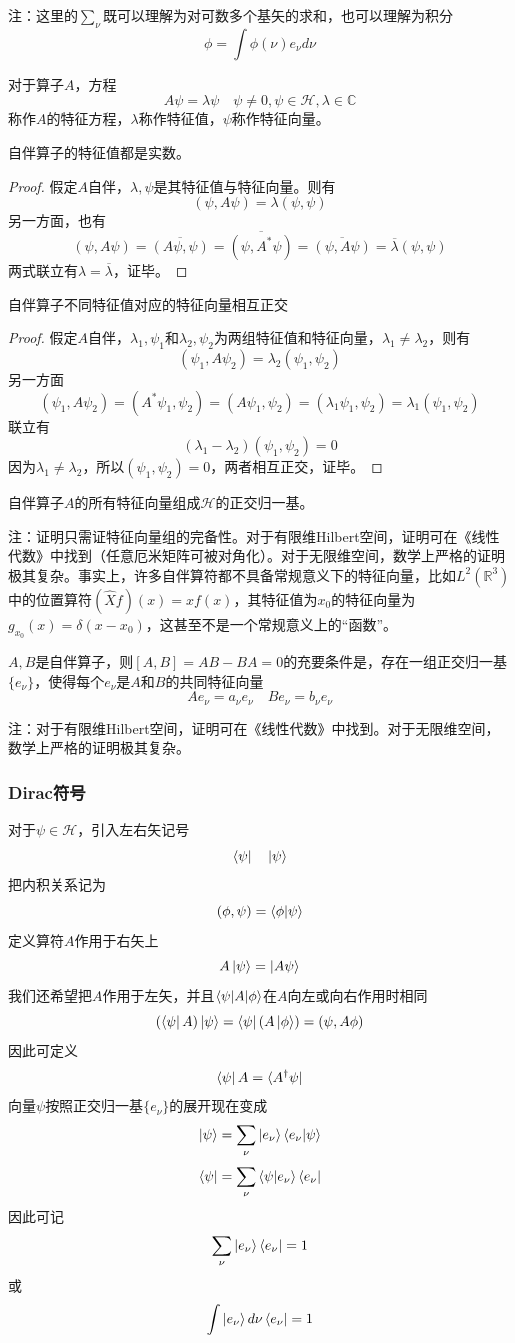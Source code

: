 注：这里的$\sum_\nu$既可以理解为对可数多个基矢的求和，也可以理解为积分
$$\phi=\int \phi(\nu)e_\nu d\nu$$

对于算子$A$，方程
$$A\psi=\lambda\psi\quad \psi\neq 0,\psi\in\mathcal{H},\lambda\in\mathbb{C}$$
称作$A$的特征方程，$\lambda$称作特征值，$\psi$称作特征向量。
\begin{theorem}
    自伴算子的特征值都是实数。
\end{theorem}
\begin{proof}
    假定$A$自伴，$\lambda,\psi$是其特征值与特征向量。则有
    $$(\psi,A\psi)=\lambda(\psi,\psi)$$
    另一方面，也有
    $$(\psi,A\psi)=\overline{(A\psi,\psi)}=\overline{(\psi,A^*\psi)}=\overline{(\psi,A\psi)}=\overline{\lambda}(\psi,\psi)$$
    两式联立有$\lambda=\overline{\lambda}$，证毕。
\end{proof}
\begin{theorem}
    自伴算子不同特征值对应的特征向量相互正交
\end{theorem}
\begin{proof}
    假定$A$自伴，$\lambda_1,\psi_1$和$\lambda_2,\psi_2$为两组特征值和特征向量，$\lambda_1\neq\lambda_2$，则有
    $$(\psi_1,A\psi_2)=\lambda_2(\psi_1,\psi_2)$$
    另一方面
    $$(\psi_1,A\psi_2)=(A^*\psi_1,\psi_2)=(A\psi_1,\psi_2)=(\lambda_1\psi_1,\psi_2)=\lambda_1(\psi_1,\psi_2)$$
    联立有
    $$(\lambda_1-\lambda_2)(\psi_1,\psi_2)=0$$
    因为$\lambda_1\neq\lambda_2$，所以$(\psi_1,\psi_2)=0$，两者相互正交，证毕。
\end{proof}
\begin{theorem}
    自伴算子$A$的所有特征向量组成$\mathcal{H}$的正交归一基。
\end{theorem}
注：证明只需证特征向量组的完备性。对于有限维Hilbert空间，证明可在《线性代数》中找到（任意厄米矩阵可被对角化）。对于无限维空间，数学上严格的证明极其复杂。事实上，许多自伴算符都不具备常规意义下的特征向量，比如$L^2(\mathbb{R}^3)$中的位置算符$(\hat{X}f)(x)=xf(x)$，其特征值为$x_0$的特征向量为$g_{x_0}(x)=\delta(x-x_0)$，这甚至不是一个常规意义上的“函数”。
\begin{theorem}
    $A,B$是自伴算子，则$[A,B]=AB-BA=0$的充要条件是，存在一组正交归一基$\{e_\nu\}$，使得每个$e_\nu$是$A$和$B$的共同特征向量
    $$Ae_\nu=a_{\nu}e_\nu\quad Be_\nu=b_\nu e_\nu$$
\end{theorem}
注：对于有限维Hilbert空间，证明可在《线性代数》中找到。对于无限维空间，数学上严格的证明极其复杂。
\subsubsection{Dirac符号}
对于$\psi\in\mathcal{H}$，引入左右矢记号
$$\bra{\psi}\quad \ket{\psi}$$
把内积关系记为
$$(\phi,\psi)=\braket{\phi|\psi}$$
定义算符$A$作用于右矢上
$$A\ket{\psi}=\ket{A\psi}$$
我们还希望把$A$作用于左矢，并且$\braket{\psi|A|\phi}$在$A$向左或向右作用时相同
$$(\bra{\psi}A)\ket{\psi}=\bra{\psi}(A\ket{\phi})=(\psi,A\phi)$$
因此可定义
$$\bra{\psi}A=\bra{A^\dagger\psi}$$
向量$\psi$按照正交归一基$\{e_\nu\}$的展开现在变成
$$\ket{\psi}=\sum_\nu\ket{e_\nu}\braket{e_\nu|\psi}$$
$$\bra{\psi}=\sum_\nu\braket{\psi|e_\nu}\bra{e_\nu}$$
因此可记
$$\sum_\nu\ket{e_\nu}\bra{e_\nu}=1$$
或
$$\int \ket{e_\nu}d\nu\bra{e_\nu}=1$$

